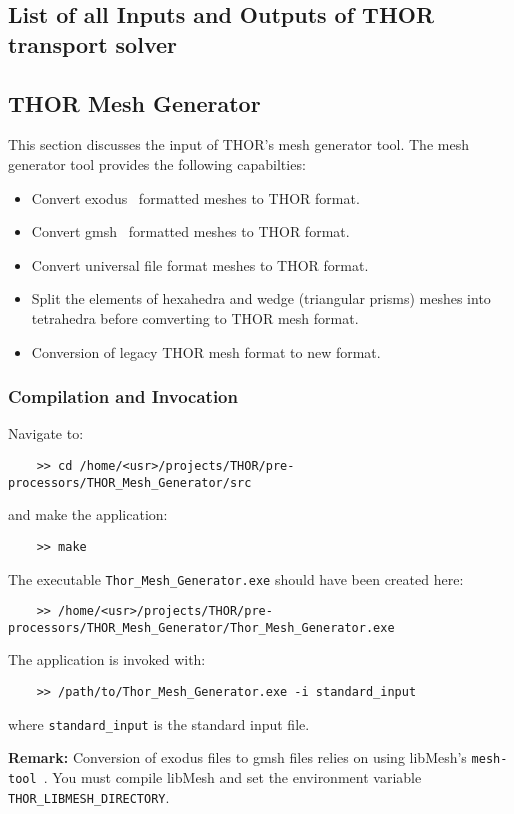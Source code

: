 \subsection{List of all Inputs and Outputs of THOR transport solver}

\subsection{THOR Mesh Generator}
This section discusses the input of THOR's mesh generator tool. The mesh generator tool provides the following capabilties:
\begin{itemize}
    \item Convert exodus~\cite{exodus_format} formatted meshes to THOR format.
    \item Convert gmsh~\cite{gmsh_ref} formatted meshes to THOR format.
    \item Convert universal file format meshes to THOR format.
    \item Split the elements of hexahedra and wedge (triangular prisms) meshes into tetrahedra before comverting to THOR mesh format.
    \item Conversion of legacy THOR mesh format to new format. 
\end{itemize}

\subsubsection{Compilation and Invocation}
Navigate to:
\begin{verbatim}
    >> cd /home/<usr>/projects/THOR/pre-processors/THOR_Mesh_Generator/src
\end{verbatim}
and make the application:
\begin{verbatim}
    >> make
\end{verbatim}
The executable \verb"Thor_Mesh_Generator.exe" should have been created here:
\begin{verbatim}
    >> /home/<usr>/projects/THOR/pre-processors/THOR_Mesh_Generator/Thor_Mesh_Generator.exe
\end{verbatim}
The application is invoked with:
\begin{verbatim}
    >> /path/to/Thor_Mesh_Generator.exe -i standard_input
\end{verbatim}
where \verb"standard_input" is the standard input file.

\noindent\textbf{Remark:} Conversion of exodus files to gmsh files relies on using libMesh's \verb"mesh-tool"~\cite{libMeshPaper}. You must compile libMesh and set the environment variable \verb"THOR_LIBMESH_DIRECTORY".

